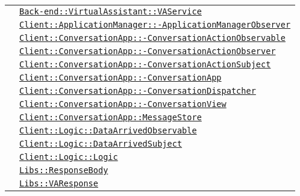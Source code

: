 \begin{longtable}{|>{\centering}m{3cm}|m{10cm}<{\centering}|}
& \hyperref[Back-end::VirtualAssistant::VAService]{\texttt{Back-end::VirtualAssistant::VAService}}\\
& \hyperref[Client::ApplicationManager::ApplicationManagerObserver]{\texttt{Client::ApplicationManager::-\linebreak ApplicationManagerObserver}}\\
& \hyperref[Client::ConversationApp::ConversationActionObservable]{\texttt{Client::ConversationApp::-\linebreak ConversationActionObservable}}\\
& \hyperref[Client::ConversationApp::ConversationActionObserver]{\texttt{Client::ConversationApp::-\linebreak ConversationActionObserver}}\\
& \hyperref[Client::ConversationApp::ConversationActionSubject]{\texttt{Client::ConversationApp::-\linebreak ConversationActionSubject}}\\
& \hyperref[Client::ConversationApp::ConversationApp]{\texttt{Client::ConversationApp::-\linebreak ConversationApp}}\\
& \hyperref[Client::ConversationApp::ConversationDispatcher]{\texttt{Client::ConversationApp::-\linebreak ConversationDispatcher}}\\
& \hyperref[Client::ConversationApp::ConversationView]{\texttt{Client::ConversationApp::-\linebreak ConversationView}}\\
& \hyperref[Client::ConversationApp::MessageStore]{\texttt{Client::ConversationApp::MessageStore}}\\
& \hyperref[Client::Logic::DataArrivedObservable]{\texttt{Client::Logic::DataArrivedObservable}}\\
& \hyperref[Client::Logic::DataArrivedSubject]{\texttt{Client::Logic::DataArrivedSubject}}\\
& \hyperref[Client::Logic::Logic]{\texttt{Client::Logic::Logic}}\\
& \hyperref[Libs::ResponseBody]{\texttt{Libs::ResponseBody}}\\
& \hyperref[Libs::VAResponse]{\texttt{Libs::VAResponse}}\\ \hline


\end{longtable}
